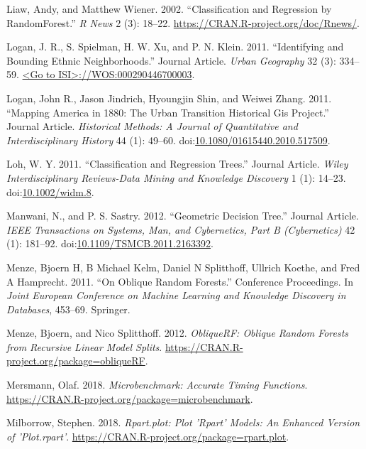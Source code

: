 \documentclass[]{elsarticle} %
\begin{document}
\hypertarget{ref-Liaw2002}{}
Liaw, Andy, and Matthew Wiener. 2002. ``Classification and Regression by
RandomForest.'' \emph{R News} 2 (3): 18--22.
\url{https://CRAN.R-project.org/doc/Rnews/}.

\hypertarget{ref-Logan2011}{}
Logan, J. R., S. Spielman, H. W. Xu, and P. N. Klein. 2011.
``Identifying and Bounding Ethnic Neighborhoods.'' Journal Article.
\emph{Urban Geography} 32 (3): 334--59.
\href{\%3CGo\%20to\%20ISI\%3E://WOS:000290446700003}{\textless{}Go to ISI\textgreater{}://WOS:000290446700003}.

\hypertarget{ref-Logan2011urbanhistorical}{}
Logan, John R., Jason Jindrich, Hyoungjin Shin, and Weiwei Zhang. 2011.
``Mapping America in 1880: The Urban Transition Historical Gis
Project.'' Journal Article. \emph{Historical Methods: A Journal of
Quantitative and Interdisciplinary History} 44 (1): 49--60.
doi:\href{https://doi.org/10.1080/01615440.2010.517509}{10.1080/01615440.2010.517509}.

\hypertarget{ref-Loh2011}{}
Loh, W. Y. 2011. ``Classification and Regression Trees.'' Journal
Article. \emph{Wiley Interdisciplinary Reviews-Data Mining and Knowledge
Discovery} 1 (1): 14--23.
doi:\href{https://doi.org/10.1002/widm.8}{10.1002/widm.8}.

\hypertarget{ref-Manwani2012}{}
Manwani, N., and P. S. Sastry. 2012. ``Geometric Decision Tree.''
Journal Article. \emph{IEEE Transactions on Systems, Man, and
Cybernetics, Part B (Cybernetics)} 42 (1): 181--92.
doi:\href{https://doi.org/10.1109/TSMCB.2011.2163392}{10.1109/TSMCB.2011.2163392}.

\hypertarget{ref-Menze2011}{}
Menze, Bjoern H, B Michael Kelm, Daniel N Splitthoff, Ullrich Koethe,
and Fred A Hamprecht. 2011. ``On Oblique Random Forests.'' Conference
Proceedings. In \emph{Joint European Conference on Machine Learning and
Knowledge Discovery in Databases}, 453--69. Springer.

\hypertarget{ref-Menze2012}{}
Menze, Bjoern, and Nico Splitthoff. 2012. \emph{ObliqueRF: Oblique
Random Forests from Recursive Linear Model Splits}.
\url{https://CRAN.R-project.org/package=obliqueRF}.

\hypertarget{ref-Mersmann2018}{}
Mersmann, Olaf. 2018. \emph{Microbenchmark: Accurate Timing Functions}.
\url{https://CRAN.R-project.org/package=microbenchmark}.

\hypertarget{ref-Milborrow2018}{}
Milborrow, Stephen. 2018. \emph{Rpart.plot: Plot 'Rpart' Models: An
Enhanced Version of 'Plot.rpart'}.
\url{https://CRAN.R-project.org/package=rpart.plot}.
\end{document}
